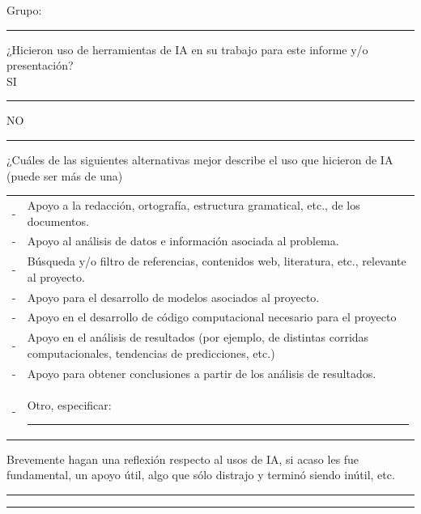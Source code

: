 \noindent Grupo: \rule{5cm}{0.4pt}

\vspace{0.6cm}

\noindent ¿Hicieron uso de herramientas de IA en su trabajo para este informe y/o presentación? \\
SI \rule{1cm}{0.4pt} \hspace{1cm} NO \rule{1.5cm}{0.4pt}

\vspace{0.7cm}

\noindent ¿Cuáles de las siguientes alternativas mejor describe el uso que hicieron de IA (puede ser más de una)

\vspace{0.4cm}

\noindent
\begin{tabular}{@{}p{} p{}@{}}
- & Apoyo a la redacción, ortografía, estructura gramatical, etc., de los documentos. \\
- & Apoyo al análisis de datos e información asociada al problema. \\
- & Búsqueda y/o filtro de referencias, contenidos web, literatura, etc., relevante al proyecto. \\
- & Apoyo para el desarrollo de modelos asociados al proyecto. \\
- & Apoyo en el desarrollo de código computacional necesario para el proyecto \\
- & Apoyo en el análisis de resultados (por ejemplo, de distintas corridas computacionales, tendencias de predicciones, etc.) \\
- & Apoyo para obtener conclusiones a partir de los análisis de resultados. \\
- & Otro, especificar: \rule{10cm}{0.4pt}
\end{tabular}

\vspace{0.8cm}

\noindent Brevemente hagan una reflexión respecto al usos de IA, si acaso les fue fundamental, un apoyo útil, algo que sólo distrajo y terminó siendo inútil, etc.

\vspace{0.6cm}

\noindent \rule{\textwidth}{0.4pt}

\vspace{0.5cm}

\noindent \rule{\textwidth}{0.4pt}

\vspace{0.5cm}

